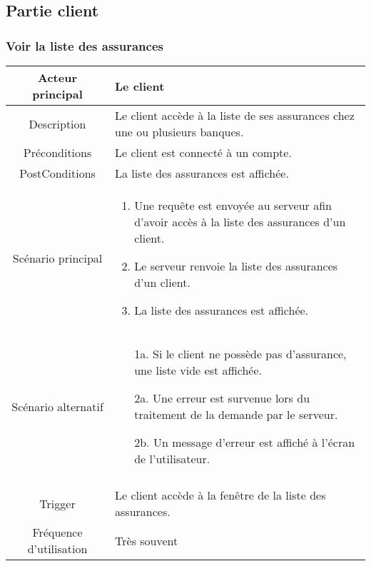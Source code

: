 \documentclass{article}
\begin{document}
\subsection{Partie client}
\subsubsection{Voir la liste des assurances}
\begin{table}[h]
    \begin{tabular}{|c|p{10cm}|}
       \hline
       Acteur principal&Le client\\
       \hline
       Description&Le client accède à la liste de ses assurances chez une ou plusieurs banques.\\
       \hline
       Préconditions&Le client est connecté à un compte.\\
       \hline
       PostConditions&La liste des assurances est affichée.\\
       \hline
       Scénario principal& 
             \begin{enumerate}
                \item Une requête est envoyée au serveur afin d'avoir accès à la liste des assurances d'un client.
                \item Le serveur renvoie la liste des assurances d'un client.
                \item La liste des assurances est affichée.
             \end{enumerate}     \\
       \hline
       Scénario alternatif&
        \begin{itemize}
            \item[1a.] Si le client ne possède pas d'assurance, une liste vide est affichée.
            \item[2a.] Une erreur est survenue lors du traitement de la demande par le serveur.
            \item[2b.] Un message d'erreur est affiché à l'écran de l'utilisateur. 
        \end{itemize}     \\
       \\
       \hline
       Trigger&Le client accède à la fenêtre de la liste des assurances.\\
       \hline
       Fréquence d'utilisation&Très souvent\\
       \hline
    \end{tabular}
 \end{table}
\end{document}
